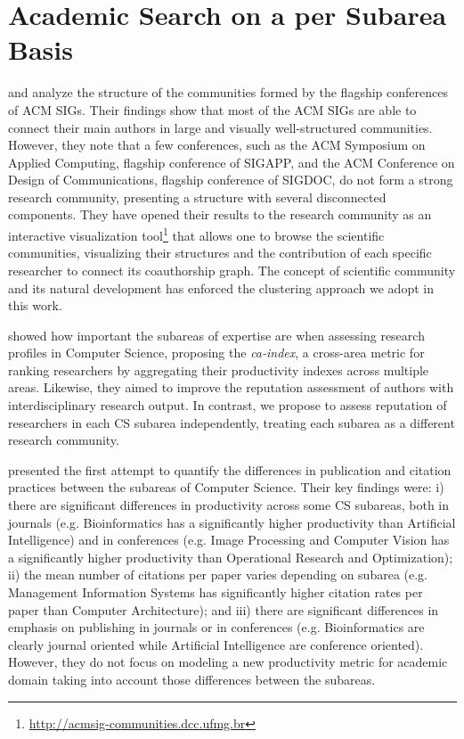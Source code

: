 \documentclass[msc]{ppgccufmg}
\begin{document}
\section{Academic Search on a per Subarea Basis}

\cite{alves} and \cite{laendersigs15} analyze the structure of the communities formed by the flagship conferences of ACM SIGs. Their findings show that most of the ACM SIGs are able to connect their main authors in large and visually well-structured communities. However, they note that a few conferences, such as the ACM Symposium on Applied Computing, flagship conference of SIGAPP, and the ACM Conference on Design of Communications, flagship conference of SIGDOC, do not form a strong research community, presenting a structure with several disconnected components. They have opened their results to the research community as an interactive visualization tool\footnote{\url{http://acmsig-communities.dcc.ufmg.br}} that allows one to browse the scientific communities, visualizing their structures and the contribution of each specific researcher to connect its coauthorship graph. The concept of scientific community and its natural development has enforced the clustering approach we adopt in this work.

\cite{lima2013jcdl} showed how important the subareas of expertise are when assessing research profiles in Computer Science, proposing the \textit{ca-index}, a cross-area metric for ranking researchers by aggregating their productivity indexes across multiple areas. Likewise, they aimed to improve the  reputation assessment of authors with interdisciplinary research output. In contrast, we propose to assess reputation of researchers in each CS subarea independently, treating each subarea as a different research community.

\cite{wainer13} presented the first attempt to quantify the differences in publication and citation practices between the subareas of Computer Science. Their key findings were: i) there are significant differences in productivity across some CS subareas, both in journals (e.g. Bioinformatics has a significantly higher productivity than Artificial Intelligence) and in conferences (e.g. Image Processing and Computer Vision has a significantly higher productivity than Operational Research and Optimization); ii) the mean number of citations per paper varies depending on subarea (e.g. Management Information Systems has significantly higher citation rates per paper than Computer Architecture); and iii) there are significant differences in emphasis on publishing in journals or in conferences (e.g. Bioinformatics are clearly journal oriented while Artificial Intelligence are conference oriented). However, they do not focus on modeling a new productivity metric for academic domain taking into account those differences between the subareas.
\end{document}
